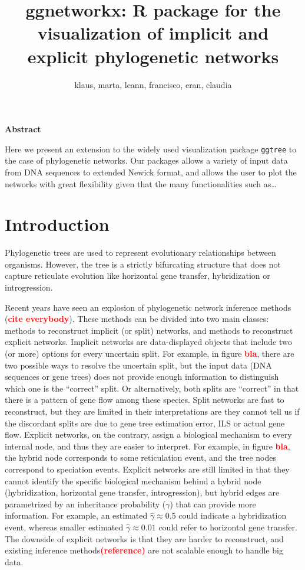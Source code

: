 \documentclass[]{IEEEtran}
\title{ggnetworkx: R package for the visualization of implicit and explicit phylogenetic networks}
\author{klaus, marta, leann, francisco, eran, claudia}
\date{}
\begin{document}
\maketitle

\begin{center}
\textbf{Abstract} 
\end{center}

Here we present an extension to the widely used visualization package \texttt{ggtree} to the case of phylogenetic networks. Our packages allows a variety of input data from DNA sequences to extended Newick format, and allows the user to plot the networks with great flexibility given that the many functionalities such as\ldots{}

\hypertarget{introduction}{%
\section{Introduction}\label{introduction}}

Phylogenetic trees are used to represent evolutionary relationships between organisms. However, the tree is a strictly bifurcating structure that does not capture reticulate evolution like horizontal gene transfer, hybridization or introgression.

Recent years have seen an explosion of phylogenetic network inference methods (\textcolor{red}{\textbf{cite everybody}}). These methods can be divided into two main classes: methods to reconstruct implicit (or split) networks, and methods to reconstruct explicit networks. Implicit networks are data-displayed objects that include two (or more) options for every uncertain split. For example, in figure \textcolor{red}{\textbf{bla}}, there are two possible ways to resolve the uncertain split, but the input data (DNA sequences or gene trees) does not provide enough information to distinguish which one is the ``correct'' split. Or alternatively, both splits are ``correct'' in that there is a pattern of gene flow among these species. Split networks are fast to reconstruct, but they are limited in their interpretations are they cannot tell us if the discordant splits are due to gene tree estimation error, ILS or actual gene flow.
Explicit networks, on the contrary, assign a biological mechanism to every internal node, and thus they are easier to interpret. For example, in figure \textcolor{red}{\textbf{bla}}, the hybrid node corresponds to some reticulation event, and the tree nodes correspond to speciation events. Explicit networks are still limited in that they cannot identify the specific biological mechanism behind a hybrid node (hybridization, horizontal gene transfer, introgression), but hybrid edges are parametrized by an inheritance probability (\(\gamma\)) that can provide more information. For example, an estimated \(\hat{\gamma} \approx 0.5\) could indicate a hybridization event, whereas smaller estimated \(\hat{\gamma} \approx 0.01\) could refer to horizontal gene transfer. The downside of explicit networks is that they are harder to reconstruct, and existing inference methods\textcolor{red}{\textbf{(reference)}} are not scalable enough to handle big data.
\end{document}
